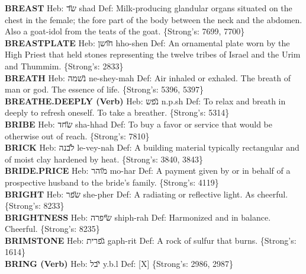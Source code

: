 {\textbf{BREAST} Heb: {\large\H שד} shad Def: Milk-producing glandular organs situated on the chest in the female; the fore part of the body between the neck and the abdomen. Also a goat-idol from the teats of the goat. \{Strong's: 7699, 7700\}\hfill{}\\

\textbf{BREASTPLATE} Heb: {\large\H חושן} hho-shen Def: An ornamental plate worn by the High Priest that held stones representing the twelve tribes of Israel and the Urim and Thummim. \{Strong's: 2833\}\hfill{}\\

\textbf{BREATH} Heb: {\large\H נשמה} ne-shey-mah Def: Air inhaled or exhaled. The breath of man or god. The essence of life. \{Strong's: 5396, 5397\}\hfill{}\\

\textbf{BREATHE.DEEPLY (Verb)} Heb: {\large\H נפש} n.p.sh Def: To relax and breath in deeply to refresh oneself. To take a breather. \{Strong's: 5314\}\hfill{}\\

\textbf{BRIBE} Heb: {\large\H שחד} sha-hhad Def: To buy a favor or service that would be otherwise out of reach. \{Strong's: 7810\}\hfill{}\\

\textbf{BRICK} Heb: {\large\H לבנה} le-vey-nah Def: A building material typically rectangular and of moist clay hardened by heat. \{Strong's: 3840, 3843\}\hfill{}\\

\textbf{BRIDE.PRICE} Heb: {\large\H מוהר} mo-har Def: A payment given by or in behalf of a prospective husband to the bride's family. \{Strong's: 4119\}\hfill{}\\

\textbf{BRIGHT} Heb: {\large\H שפר} she-pher Def: A radiating or reflective light. As cheerful. \{Strong's: 8233\}\hfill{}\\

\textbf{BRIGHTNESS} Heb: {\large\H שיפרה} shiph-rah Def: Harmonized and in balance. Cheerful. \{Strong's: 8235\}\hfill{}\\

\textbf{BRIMSTONE} Heb: {\large\H גפרית} gaph-rit Def: A rock of sulfur that burns. \{Strong's: 1614\}\hfill{}\\

\textbf{BRING (Verb)} Heb: {\large\H יבל} y.b.l Def: {[}X{]} \{Strong's: 2986, 2987\}\hfill{}\\

}
